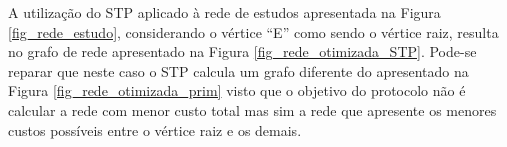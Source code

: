 \documentclass[12pt]{article}
\begin{document}

A utilização do STP aplicado à rede de estudos apresentada na Figura \ref{fig_rede_estudo}, considerando o vértice ``E'' como sendo o vértice raiz, resulta no grafo de rede apresentado na Figura \ref{fig_rede_otimizada_STP}. Pode-se reparar que neste caso o STP calcula um grafo diferente do apresentado na Figura \ref{fig_rede_otimizada_prim} visto que o objetivo do protocolo não é calcular a rede com menor custo total mas sim a rede que apresente os menores custos possíveis entre o vértice raiz e os demais.

\end{document}
